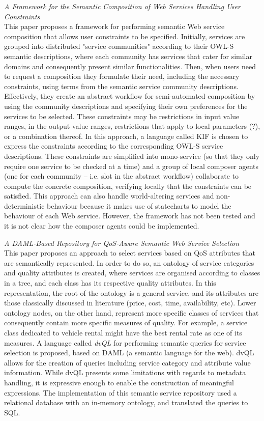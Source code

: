\textit{A Framework for the Semantic Composition of Web Services Handling User Constraints \cite{gamha2008framework}}\\
This paper proposes a framework for performing semantic Web service composition that allows user constraints
to be specified. Initially, services are grouped into distributed "service communities" according to their OWL-S semantic descriptions,
where each community has services that cater for similar domains and consequently present similar functionalities.
Then, when users need to request a composition they formulate their need, including the necessary constraints, using
terms from the semantic service community descriptions. Effectively, they create an abstract workflow for semi-automated
composition by using the community descriptions and specifying their own preferences for the services to be selected.
These constraints may be restrictions in input value ranges, in the output value ranges, restrictions that apply to local
parameters (?), or a combination thereof. In this approach, a language called KIF is chosen to express the constraints according
to the corresponding OWL-S service descriptions. These constraints are simplified into mono-service (so that they only require
one service to be checked at a time) and a group of local composer agents (one for each community -- i.e. slot in the abstract
workflow) collaborate to compute the concrete composition, verifying locally that the constraints can be satisfied. This approach
can also handle world-altering services and non-deterministic behaviour because it makes use of statecharts to model the behaviour
of each Web service. However, the framework has not been tested and it is not clear how the composer agents could be implemented.


\textit{A DAML-Based Repository for QoS-Aware Semantic Web Service Selection \cite{soydan2004daml}}\\
This paper proposes an approach to select services based on QoS attributes that are semantically represented. In order to do so, an ontology of service categories and quality attributes is created, where services are organised according to classes in a tree, and each class has its respective quality attributes. In this representation, the root of the ontology is a general service, and its attributes are those classically discussed in literature (price, cost, time, availability, etc). Lower ontology nodes, on the other hand, represent more specific classes of services that consequently contain more specific measures of quality. For example, a service class dedicated to vehicle rental might have the best rental rate as one of its measures. A language called \textit{dvQL} for performing semantic queries for service selection is proposed, based on DAML (a semantic language for the web). dvQL allows for the creation of queries including service category and attribute value information. While dvQL presents some limitations with regards to metadata handling, it is expressive enough to enable the construction of meaningful expressions. The implementation of this semantic service repository used a relational database with an in-memory ontology, and translated the queries to SQL.

